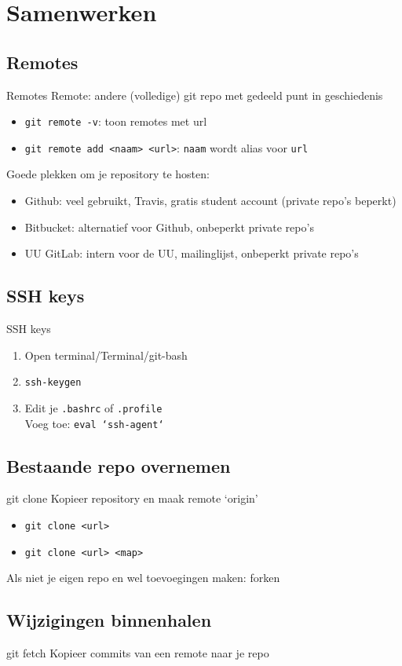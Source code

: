 \section{Samenwerken}

\subsection{Remotes}
\begin{frame}{Remotes}
	Remote: andere (volledige) git repo met gedeeld punt in geschiedenis
	\begin{itemize}
		\item \texttt{git remote -v}: toon remotes met url
		\item \texttt{git remote add <naam> <url>}: \texttt{naam} wordt alias voor \texttt{url}
	\end{itemize}
	Goede plekken om je repository te hosten:
	\begin{itemize}
		\item Github: veel gebruikt, Travis, gratis student account (private repo's beperkt)
		\item Bitbucket: alternatief voor Github, onbeperkt private repo's
		\item UU GitLab: intern voor de UU, mailinglijst, onbeperkt private repo's
	\end{itemize}
\end{frame}

\subsection{SSH keys}
\begin{frame}{SSH keys}
	\begin{enumerate}
		\item Open terminal/Terminal/git-bash
		\item \texttt{ssh-keygen}
		\item Edit je \texttt{.bashrc} of \texttt{.profile}\\
			Voeg toe: \texttt{eval `ssh-agent`}
	\end{enumerate}
\end{frame}

\subsection{Bestaande repo overnemen}
\begin{frame}{git clone}
	Kopieer repository en maak remote `origin'
	\begin{itemize}
		\item \texttt{git clone <url>}
		\item \texttt{git clone <url> <map>}
	\end{itemize}
	Als niet je eigen repo en wel toevoegingen maken: forken
\end{frame}

\subsection{Wijzigingen binnenhalen}
\begin{frame}{git fetch}
	Kopieer commits van een remote naar je repo
\end{frame}

